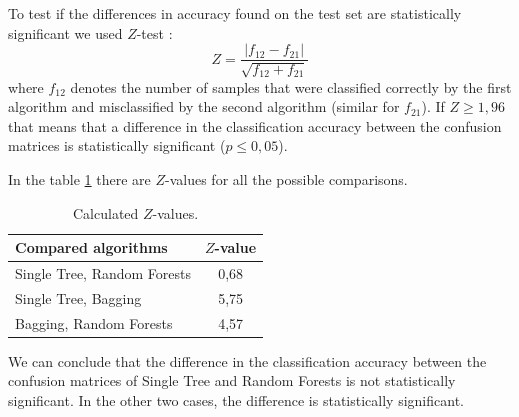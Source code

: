\documentclass[a4paper,11pt]{article}
\begin{document}
To test if the differences in accuracy found on the test set are statistically significant we used $Z$-test \cite{accuracy}:
\[
Z = \frac{|f_{12} - f_{21}|}{\sqrt{f_{12} + f_{21}}}
\]
where $f_{12}$ denotes the number of samples that were classified correctly by the first algorithm and misclassified by the second algorithm (similar for $f_{21}$). If $Z \geq 1{,}96$ that means that a difference in the classification accuracy between the confusion matrices is statistically significant ($p \leq 0{,}05$).

In the table \ref{tab: z} there are $Z$-values for all the possible comparisons.
\begin{table}[h!]
\centering
	\begin{tabular}{l||c}
	Compared algorithms & $Z$-value   \\ \hline \hline
	Single Tree, Random Forests & 0{,}68 \\ \hline
	Single Tree, Bagging &  5{,}75 \\ \hline
	Bagging, Random Forests & 4{,}57
	\end{tabular}
	\caption{Calculated $Z$-values.}
	\label{tab: z}
\end{table}

We can conclude that the difference in the classification accuracy between the confusion matrices of Single Tree and Random Forests is not statistically significant. In the other two cases, the difference is statistically significant.



\end{document}
